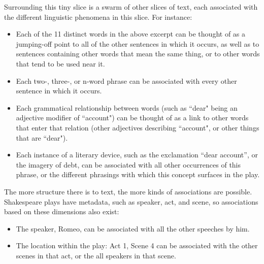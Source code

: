 \documentclass{sig-alternate}
\begin{document}
Surrounding this tiny slice is a swarm of other slices of text, each associated with the different linguistic phenomena in this slice. For instance:
\begin{itemize}
\item Each of the 11 distinct words in the above excerpt can be thought of as a jumping-off point to all of the other sentences in which it occurs, as well as to sentences containing other words that mean the same thing, or to other words that tend to be used near it.
\item Each  two-, three-, or n-word phrase can be associated with every other sentence in which it occurs.
\item  Each grammatical relationship between words (such as ``dear" being an adjective modifier of  ``account") can be thought of as a link to other words that enter that relation (other adjectives describing ``account", or other things that are ``dear").
\item Each instance of a literary device, such as the exclamation ``dear account'', or the imagery of debt, can be associated with all other occurrences of this phrase, or the different phrasings with which this concept surfaces in the play.
\end{itemize}

The more structure there is to text, the more kinds of associations are possible. Shakespeare plays have metadata, such as speaker, act, and scene, so associations based on these dimensions also exist:
\begin{itemize}
\item The speaker, Romeo, can be associated with all the other speeches by him.
\item The location within the play: Act 1, Scene 4 can be associated with the other scenes in that act, or the all speakers in that scene.
\end{itemize}
\end{document}
